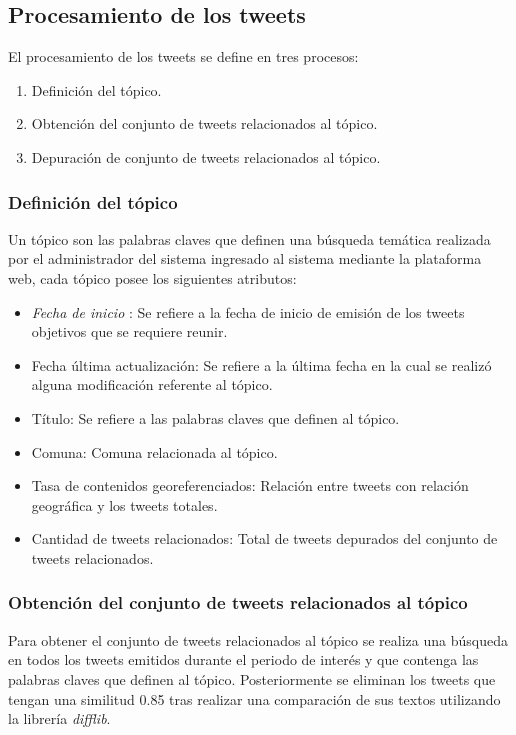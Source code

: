 \subsection{Procesamiento de los tweets}

El procesamiento de los tweets se define en tres procesos:
\begin{enumerate}
	\item{Definición del tópico.}
	\item{Obtención del conjunto de tweets relacionados al tópico.}
	\item{Depuración de conjunto de tweets relacionados al tópico.}
\end{enumerate}

\subsubsection{Definición del tópico}

Un tópico son las palabras claves que definen una búsqueda temática realizada por el administrador del sistema ingresado al sistema mediante la plataforma web, cada tópico posee los siguientes atributos:
\begin{itemize}
	\item \textit{Fecha de inicio} : Se refiere a la fecha de inicio de emisión de los tweets objetivos que se requiere reunir.
	\item Fecha última actualización: Se refiere a la última fecha en la cual se realizó alguna modificación referente al tópico.
	\item Título: Se refiere a las palabras claves que definen al tópico. 
	\item Comuna: Comuna relacionada al tópico.
	\item Tasa de contenidos georeferenciados: Relación entre tweets con relación geográfica y los tweets totales.
	\item Cantidad de tweets relacionados: Total de tweets depurados del conjunto de tweets relacionados. 
\end{itemize}

\subsubsection{Obtención del conjunto de tweets relacionados al tópico}

Para obtener el conjunto de tweets relacionados al tópico se realiza una búsqueda en todos los tweets emitidos durante el periodo de interés
y que contenga las palabras claves que definen al tópico. Posteriormente se eliminan los tweets que tengan una similitud 0.85 tras realizar 
una comparación de sus textos utilizando la librería \emph{difflib}.

